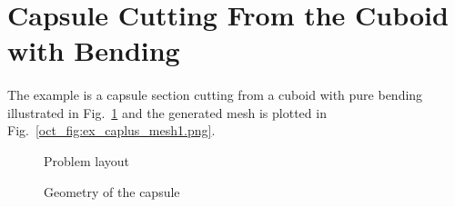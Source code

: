 \section{Capsule Cutting From the Cuboid with Bending}
\paragraph{}
The example is a capsule section cutting from a cuboid with pure bending illustrated in Fig.~\ref{oct_fig:ex_caplus_layout} and the generated mesh is plotted in Fig.~\ref{oct_fig:ex_caplus_mesh1.png}.
\begin{figure}[h!]
  \centering
  \caption{Problem layout}
  \label{oct_fig:ex_caplus_layout}
\end{figure}
%
\begin{figure}[h!]
  \centering
  \caption{Geometry of the capsule}
  \label{oct_fig:ex_caplus_geo}
\end{figure}
%
